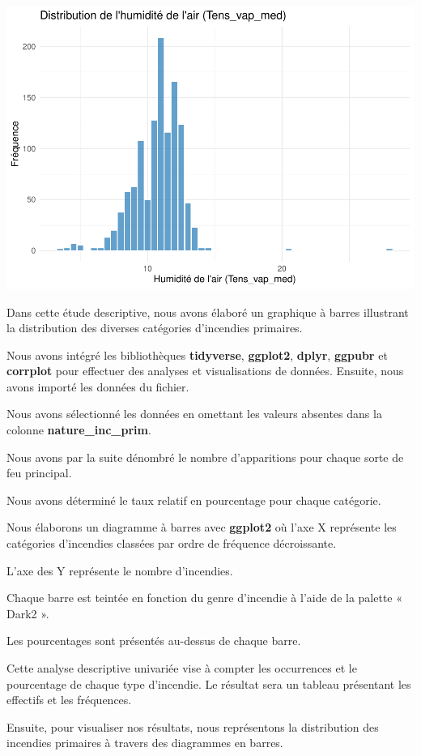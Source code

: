 \documentclass[
]{article}
\begin{document}
\includegraphics{Rapport_files/figure-latex/unnamed-chunk-1-1.pdf}

Dans cette étude descriptive, nous avons élaboré un graphique à barres
illustrant la distribution des diverses catégories d'incendies
primaires.

Nous avons intégré les bibliothèques \textbf{tidyverse},
\textbf{ggplot2}, \textbf{dplyr}, \textbf{ggpubr} et \textbf{corrplot}
pour effectuer des analyses et visualisations de données. Ensuite, nous
avons importé les données du fichier.

Nous avons sélectionné les données en omettant les valeurs absentes dans
la colonne \textbf{nature\_inc\_prim}.

Nous avons par la suite dénombré le nombre d'apparitions pour chaque
sorte de feu principal.

Nous avons déterminé le taux relatif en pourcentage pour chaque
catégorie.

Nous élaborons un diagramme à barres avec \textbf{ggplot2} où l'axe X
représente les catégories d'incendies classées par ordre de fréquence
décroissante.

L'axe des Y représente le nombre d'incendies.

Chaque barre est teintée en fonction du genre d'incendie à l'aide de la
palette « Dark2 ».

Les pourcentages sont présentés au-dessus de chaque barre.

Cette analyse descriptive univariée vise à compter les occurrences et le
pourcentage de chaque type d'incendie. Le résultat sera un tableau
présentant les effectifs et les fréquences.

Ensuite, pour visualiser nos résultats, nous représentons la
distribution des incendies primaires à travers des diagrammes en barres.
\end{document}
